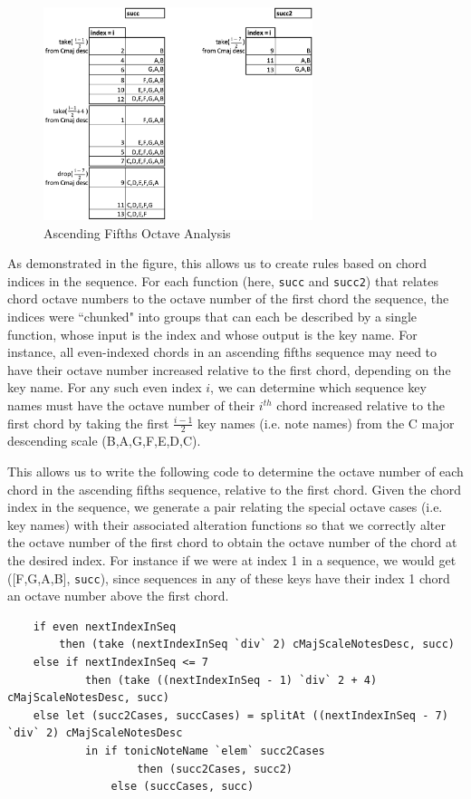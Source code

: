 \documentclass{report}
\begin{document}
\begin{figure}[h!]
\centering
\includegraphics[width=0.7\textwidth]{images/asc_fifths_octave_analysis}
  \caption{Ascending Fifths Octave Analysis}
  \label{fig:asc_fifths_octave_analysis}
\end{figure}
\newpage

As demonstrated in the figure, this allows us to create rules based on chord indices in the sequence. For each function (here, \verb.succ. and \verb.succ2.) that relates chord octave numbers to the octave number of the first chord the sequence, the indices were ``chunked" into groups that can each be described by a single function, whose input is the index and whose output is the key name. For instance, all even-indexed chords in an ascending fifths sequence may need to have their octave  number increased relative to the first chord, depending on the key name. For any such even index $i$, we can determine which sequence key names must have the octave number of their $i^{th}$ chord increased relative to the first chord by taking the first $\frac{i-1}{2}$ key names (i.e. note names) from the C major descending scale (B,A,G,F,E,D,C). 

This allows us to write the following code to determine the octave number of each chord in the ascending fifths sequence, relative to the first chord. Given the chord index in the sequence, we generate a pair relating the special octave cases (i.e. key names) with their associated alteration functions so that we correctly alter the octave number of the first chord to obtain the octave number of the chord at the desired index. For instance if we were at index 1 in a sequence, we would get ([F,G,A,B], \verb.succ.), since sequences in any of these keys have their index 1 chord an octave number above the first chord.

\begin{verbatim}
    if even nextIndexInSeq 
        then (take (nextIndexInSeq `div` 2) cMajScaleNotesDesc, succ)
    else if nextIndexInSeq <= 7
            then (take ((nextIndexInSeq - 1) `div` 2 + 4) cMajScaleNotesDesc, succ)
    else let (succ2Cases, succCases) = splitAt ((nextIndexInSeq - 7) `div` 2) cMajScaleNotesDesc
            in if tonicNoteName `elem` succ2Cases 
                    then (succ2Cases, succ2) 
                else (succCases, succ)
\end{verbatim}
\end{document}
